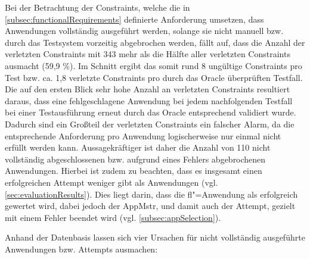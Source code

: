 Bei der Betrachtung der Constraints, welche die in \cref{subsec:functionalRequirements} definierte Anforderung umsetzen, dass Anwendungen vollständig ausgeführt werden, solange sie nicht manuell bzw. durch das Testsystem vorzeitig abgebrochen werden, fällt auf, dass die Anzahl der verletzten Constraints mit 343 mehr als die Hälfte aller verletzten Constraints ausmacht (59,9 \%).
Im Schnitt ergibt das somit rund 8 ungültige Constraints pro Test bzw. ca. 1,8 verletzte Constraints pro durch das Oracle überprüften Testfall.
Die auf den ersten Blick sehr hohe Anzahl an verletzten Constraints resultiert daraus, dass eine fehlgeschlagene Anwendung bei jedem nachfolgenden Testfall bei einer Testausführung erneut durch das Oracle entsprechend validiert wurde.
Dadurch sind ein Großteil der verletzten Constraints ein falscher Alarm, da die entsprechende Anforderung pro Anwendung logischerweise nur einmal nicht erfüllt werden kann.
Aussagekräftiger ist daher die Anzahl von 110 nicht vollständig abgeschlossenen bzw. aufgrund eines Fehlers abgebrochenen Anwendungen.
Hierbei ist zudem zu beachten, dass es insgesamt einen erfolgreichen Attempt weniger gibt als Anwendungen (vgl. \cref{sec:evaluationResults}).
Dies liegt darin, dass die \acrlong{fl}"=Anwendung als erfolgreich gewertet wird, dabei jedoch der \gls{AppMstr}, und damit auch der Attempt, gezielt mit einem Fehler beendet wird (vgl. \cref{subsec:appSelection}).

Anhand der Datenbasis lassen sich vier Ursachen für nicht vollständig ausgeführte Anwendungen bzw. Attempts ausmachen:

